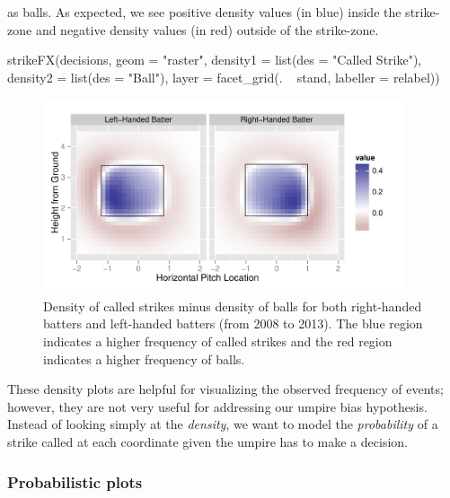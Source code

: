 \begin{article}
as balls. As expected, we see positive density values (in blue) inside
the strike-zone and negative density values (in red) outside of the
strike-zone. 
%
\begin{Schunk}
\begin{Sinput}
strikeFX(decisions, geom = "raster", density1 = list(des = "Called Strike"), 
  density2 = list(des = "Ball"), layer = facet_grid(. ~ stand, labeller = relabel)) 
\end{Sinput}
\end{Schunk}
%
\begin{figure}[h]
\centerline{\includegraphics[width=0.95\textwidth]{strikesVSballs.pdf}}

\caption{\label{fig:strikesVSballs} Density of called strikes minus density
of balls for both right-handed batters and left-handed batters (from
2008 to 2013). The blue region indicates a higher frequency of called
strikes and the red region indicates a higher frequency of balls.}
\end{figure}


These density plots are helpful for visualizing the observed frequency
of events; however, they are not very useful for addressing our umpire
bias hypothesis. Instead of looking simply at the \emph{density},
we want to model the \emph{probability} of a strike called at each
coordinate given the umpire has to make a decision. 


\subsubsection{Probabilistic plots}


\end{article}
